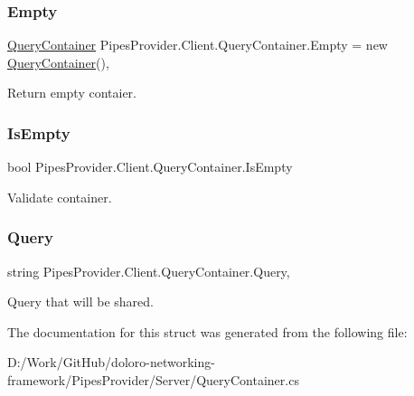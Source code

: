 \subsubsection{\texorpdfstring{Empty}{Empty}}
{\footnotesize\ttfamily \mbox{\hyperlink{struct_pipes_provider_1_1_client_1_1_query_container}{Query\+Container}} Pipes\+Provider.\+Client.\+Query\+Container.\+Empty = new \mbox{\hyperlink{struct_pipes_provider_1_1_client_1_1_query_container}{Query\+Container}}()\hspace{0.3cm}{\ttfamily [static]}, {\ttfamily [get]}}



Return empty contaier. 

\mbox{\label{struct_pipes_provider_1_1_client_1_1_query_container_ab2ceeaac61f04d4ce7e41bc8ea931a0f}} 
\subsubsection{\texorpdfstring{Is\+Empty}{IsEmpty}}
{\footnotesize\ttfamily bool Pipes\+Provider.\+Client.\+Query\+Container.\+Is\+Empty\hspace{0.3cm}{\ttfamily [get]}}



Validate container. 

\mbox{\label{struct_pipes_provider_1_1_client_1_1_query_container_ada0fa04c68e6aee41d3d811d699d01aa}} 
\subsubsection{\texorpdfstring{Query}{Query}}
{\footnotesize\ttfamily string Pipes\+Provider.\+Client.\+Query\+Container.\+Query\hspace{0.3cm}{\ttfamily [get]}, {\ttfamily [set]}}



Query that will be shared. 



The documentation for this struct was generated from the following file\+:\begin{DoxyCompactItemize}
\item 
D\+:/\+Work/\+Git\+Hub/doloro-\/networking-\/framework/\+Pipes\+Provider/\+Server/Query\+Container.\+cs\end{DoxyCompactItemize}
